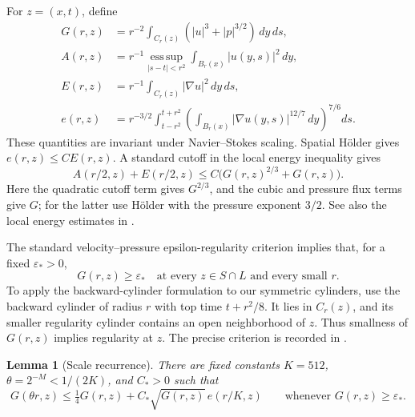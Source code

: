 \documentclass[11pt]{article}
\newtheorem{lemma}[theorem]{Lemma}
\newcommand{\esssup}{\operatorname*{ess\,sup}}
\newcommand{\eps}{\varepsilon_*}
\begin{document}
For \(z=(x,t)\), define
$$
\begin{aligned}
G(r,z)&=r^{-2}\int_{C_r(z)}(|u|^3+|p|^{3/2})\,dy\,ds,\\
A(r,z)&=r^{-1}\esssup_{|s-t|<r^2}
                  \int_{B_r(x)}|u(y,s)|^2\,dy,\\
E(r,z)&=r^{-1}\int_{C_r(z)}|\nabla u|^2\,dy\,ds,\\
e(r,z)&=r^{-3/2}\int_{t-r^2}^{t+r^2}
       \left(\int_{B_r(x)}|\nabla u(y,s)|^{12/7}\,dy\right)^{7/6}ds.
\end{aligned}
$$
These quantities are invariant under Navier--Stokes scaling. Spatial
H\"older gives \(e(r,z)\leq CE(r,z)\).
A standard cutoff in the local energy inequality gives
$$
A(r/2,z)+E(r/2,z)\leq C\bigl(G(r,z)^{2/3}+G(r,z)\bigr).
$$
Here the quadratic cutoff term gives \(G^{2/3}\), and the cubic and
pressure flux terms give \(G\); for the latter use H\"older with the
pressure exponent \(3/2\). See also the local energy estimates in
\cite{GP}.

The standard velocity--pressure epsilon-regularity criterion implies
that, for a fixed \(\eps>0\),
$$
G(r,z)\geq\eps
\quad\text{at every }z\in S\cap L\text{ and every small }r.
$$
To apply the backward-cylinder formulation to our symmetric cylinders,
use the backward cylinder of radius \(r\) with top time \(t+r^2/8\).
It lies in \(C_r(z)\), and its smaller regularity cylinder contains an
open neighborhood of \(z\). Thus smallness of \(G(r,z)\) implies
regularity at \(z\). The precise criterion is recorded in
\cite[Theorem 1.1]{GP}.

\begin{lemma}[Scale recurrence]\label{recurrence}
There are fixed constants \(K=512\), \(\theta=2^{-M}<1/(2K)\), and
\(C_*>0\) such that
$$
G(\theta r,z)\leq\tfrac14G(r,z)
   +C_*\sqrt{G(r,z)}\,e(r/K,z)
\qquad\text{whenever }G(r,z)\geq\eps.
$$
\end{lemma}
\end{document}
